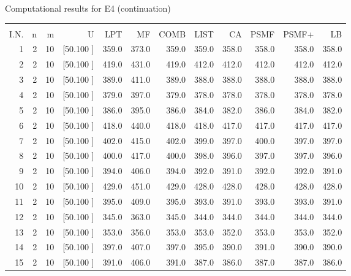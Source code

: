 \documentclass[12pt,a4paper]{article}
\begin{document}
\newpage
\begin{center}
 Computational results for E4 (continuation) {\tiny
\begin{tabular}{r r r r r r r r r r r r}\hline
    &   &   &          &        &        &        &        &        &        &        &       \\[-0.1in]
  I.N.  &  n  &  m  &  U  &  LPT  &  MF  &  COMB  &  LIST  &  CA  & PSMF &PSMF+ & LB \\[0.03in]
\hline
   1&  2& 10&[50.100    ]&   359.0&   373.0&   359.0&   359.0&   358.0&   358.0&   358.0&   358.0\\[-0.02in]
   2&  2& 10&[50.100    ]&   419.0&   431.0&   419.0&   412.0&   412.0&   412.0&   412.0&   412.0\\[-0.02in]
   3&  2& 10&[50.100    ]&   389.0&   411.0&   389.0&   388.0&   388.0&   388.0&   388.0&   388.0\\[-0.02in]
   4&  2& 10&[50.100    ]&   379.0&   397.0&   379.0&   378.0&   378.0&   378.0&   378.0&   378.0\\[-0.02in]
   5&  2& 10&[50.100    ]&   386.0&   395.0&   386.0&   384.0&   382.0&   386.0&   384.0&   382.0\\[-0.02in]
   6&  2& 10&[50.100    ]&   418.0&   440.0&   418.0&   418.0&   417.0&   417.0&   417.0&   417.0\\[-0.02in]
   7&  2& 10&[50.100    ]&   402.0&   415.0&   402.0&   399.0&   397.0&   400.0&   397.0&   397.0\\[-0.02in]
   8&  2& 10&[50.100    ]&   400.0&   417.0&   400.0&   398.0&   396.0&   397.0&   397.0&   396.0\\[-0.02in]
   9&  2& 10&[50.100    ]&   394.0&   406.0&   394.0&   392.0&   391.0&   392.0&   392.0&   391.0\\[-0.02in]
  10&  2& 10&[50.100    ]&   429.0&   451.0&   429.0&   428.0&   428.0&   428.0&   428.0&   428.0\\[-0.02in]
  11&  2& 10&[50.100    ]&   395.0&   409.0&   395.0&   393.0&   391.0&   393.0&   393.0&   391.0\\[-0.02in]
  12&  2& 10&[50.100    ]&   345.0&   363.0&   345.0&   344.0&   344.0&   344.0&   344.0&   344.0\\[-0.02in]
  13&  2& 10&[50.100    ]&   353.0&   356.0&   353.0&   353.0&   352.0&   353.0&   353.0&   352.0\\[-0.02in]
  14&  2& 10&[50.100    ]&   397.0&   407.0&   397.0&   395.0&   390.0&   391.0&   390.0&   390.0\\[-0.02in]
  15&  2& 10&[50.100    ]&   391.0&   406.0&   391.0&   387.0&   386.0&   387.0&   387.0&   386.0\\[-0.02in]

\end{tabular}}
\end{center}
\end{document}
